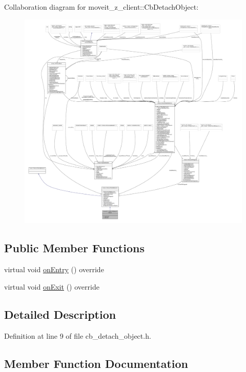 Collaboration diagram for moveit\+\_\+z\+\_\+client\+:\+:Cb\+Detach\+Object\+:
\nopagebreak
\begin{figure}[H]
\begin{center}
\leavevmode
\includegraphics[width=350pt]{classmoveit__z__client_1_1CbDetachObject__coll__graph}
\end{center}
\end{figure}
\subsection*{Public Member Functions}
\begin{DoxyCompactItemize}
\item 
virtual void \hyperlink{classmoveit__z__client_1_1CbDetachObject_a2c071ca5d2e82ef8c57d3cf2082897a2}{on\+Entry} () override
\item 
virtual void \hyperlink{classmoveit__z__client_1_1CbDetachObject_aab785402cb3bd315521ef47f75fa0e14}{on\+Exit} () override
\end{DoxyCompactItemize}


\subsection{Detailed Description}


Definition at line 9 of file cb\+\_\+detach\+\_\+object.\+h.



\subsection{Member Function Documentation}
\mbox{\label{classmoveit__z__client_1_1CbDetachObject_a2c071ca5d2e82ef8c57d3cf2082897a2}} 
